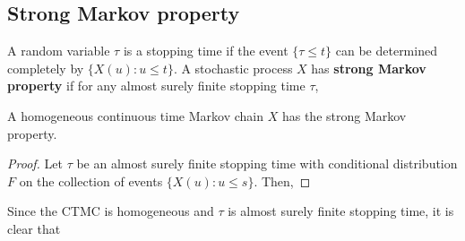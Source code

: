 \documentclass[a4paper,10pt,english]{article}
\begin{document}
\subsection{Strong Markov property}
A random variable $\tau$ is a stopping time if the event $\{\tau \leq t\}$ can be determined completely by $\{X(u): u \leqslant t\}$. 
A stochastic process $X$ has \textbf{strong Markov property} if for any almost surely finite stopping time $\tau$, 
\begin{lem}
\label{Lemma:StrongMarkovProperty}
A homogeneous continuous time Markov chain $X$ has the strong Markov property. 
\end{lem}
\begin{proof}
Let $\tau$ be an almost surely finite stopping time with conditional distribution $F$ on the collection of events $\{X(u): u \leq s\}$. 
Then, 
\end{proof}
Since the CTMC is homogeneous and $\tau$ is almost surely finite stopping time, it is clear that 
\end{document}
